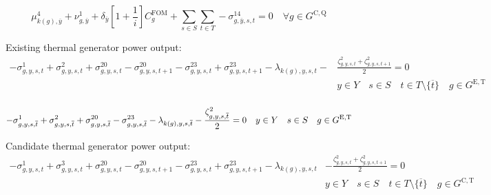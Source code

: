 \documentclass{article}
\newcommand{\sGeneratorsExistingThermal}{G^{\mathrm{E,T}}}
\newcommand{\sGeneratorsCandidateThermal}{G^{\mathrm{C,T}}}
\newcommand{\sStorageCandidate}{G^{\mathrm{C,Q}}}
\newcommand{\sYears}{Y}
\newcommand{\sScenarios}{S}
\newcommand{\sIntervals}{T}
\newcommand{\iGenerator}{g}
\newcommand{\iYear}{y}
\newcommand{\iYearTerminal}{\overline{\iYear}}
\newcommand{\iScenario}{s}
\newcommand{\iInterval}{t}
\newcommand{\iIntervalTerminal}{\overline{\iInterval}}
\newcommand{\iZone}{z}
\newcommand{\cFixedOperationsMaintenanceCostGenerator}[1][\iGenerator]{C^{\mathrm{FOM}}_{#1}}
\newcommand{\cInterestRate}{i}
\newcommand{\cDiscountRate}[1][\iYear]{\delta_{#1}}
\newcommand{\dStorageBuildLimit}[1][\iZone,\iYear]{\mu_{#1}^{4}}
\newcommand{\dTotalInstallCapacity}[1][\iGenerator,\iYear]{\nu_{#1}^{1}}
\newcommand{\dMinPowerOutput}[1][\iGenerator,\iYear,\iScenario,\iInterval]{\sigma_{#1}^{1}}
\newcommand{\dMaxPowerOutputExistingThermal}[1][\iGenerator,\iYear,\iScenario,\iInterval]{\sigma_{#1}^{2}}
\newcommand{\dMaxPowerOutputCandidateThermal}[1][\iGenerator,\iYear,\iScenario,\iInterval]{\sigma_{#1}^{3}}
\newcommand{\dMaxDischargingRateCandidate}[1][\iGenerator,\iYear,\iScenario,\iInterval]{\sigma_{#1}^{14}}
\newcommand{\dRampRateUp}[1][\iGenerator,\iYear,\iScenario,\iInterval]{\sigma_{#1}^{20}}
\newcommand{\dRampRateDown}[1][\iGenerator,\iYear,\iScenario,\iInterval]{\sigma_{#1}^{23}}
\newcommand{\dPowerBalance}[1][\iZone,\iYear,\iScenario,\iInterval]{\lambda_{#1}}
\newcommand{\dGeneratorEnergyOutput}[1][\iGenerator,\iYear,\iScenario,\iInterval]{\zeta_{#1}^{2}}
\begin{document}
\begin{equation}
\dStorageBuildLimit[k(\iGenerator),\iYearTerminal] + \dTotalInstallCapacity[\iGenerator,\iYearTerminal] + \cDiscountRate[\iYearTerminal] \left[1 + \frac{1}{\cInterestRate}\right] \cFixedOperationsMaintenanceCostGenerator + \sum\limits_{\iScenario \in \sScenarios}\sum\limits_{\iInterval \in \sIntervals} - \dMaxDischargingRateCandidate[\iGenerator,\iYearTerminal,\iScenario,\iInterval] = 0 \quad \forall \iGenerator \in \sStorageCandidate
\end{equation}

Existing thermal generator power output:
\begin{align}
-\dMinPowerOutput + \dMaxPowerOutputExistingThermal + \dRampRateUp - \dRampRateUp[\iGenerator,\iYear,\iScenario,\iInterval+1] - \dRampRateDown + \dRampRateDown[\iGenerator,\iYear,\iScenario,\iInterval+1] - \dPowerBalance[k(\iGenerator),\iYear,\iScenario,\iInterval] - & \frac{\dGeneratorEnergyOutput + \dGeneratorEnergyOutput[\iGenerator,\iYear,\iScenario,\iInterval+1]}{2} = 0\\\nonumber
& \iYear \in \sYears \quad \iScenario \in \sScenarios \quad \iInterval \in \sIntervals \setminus \{\iIntervalTerminal\} \quad \iGenerator \in \sGeneratorsExistingThermal\\\nonumber
\end{align}

\begin{equation}
-\dMinPowerOutput[\iGenerator,\iYear,\iScenario,\iIntervalTerminal] + \dMaxPowerOutputExistingThermal[\iGenerator,\iYear,\iScenario,\iIntervalTerminal] + \dRampRateUp[\iGenerator,\iYear,\iScenario,\iIntervalTerminal] - \dRampRateDown[\iGenerator,\iYear,\iScenario,\iIntervalTerminal] - \dPowerBalance[k(\iGenerator),\iYear,\iScenario,\iIntervalTerminal] - \frac{\dGeneratorEnergyOutput[\iGenerator,\iYear,\iScenario,\iIntervalTerminal]}{2} = 0 \quad \iYear \in \sYears \quad \iScenario \in \sScenarios \quad \iGenerator \in \sGeneratorsExistingThermal\\
\end{equation}

Candidate thermal generator power output:
\begin{align}
-\dMinPowerOutput + \dMaxPowerOutputCandidateThermal + \dRampRateUp - \dRampRateUp[\iGenerator,\iYear,\iScenario,\iInterval+1] - \dRampRateDown + \dRampRateDown[\iGenerator,\iYear,\iScenario,\iInterval+1] - \dPowerBalance[k(\iGenerator),\iYear,\iScenario,\iInterval] & - \frac{\dGeneratorEnergyOutput + \dGeneratorEnergyOutput[\iGenerator,\iYear,\iScenario,\iInterval+1]}{2} = 0\\\nonumber
& \iYear \in \sYears \quad \iScenario \in \sScenarios \quad \iInterval \in \sIntervals \setminus \{\iIntervalTerminal\} \quad \iGenerator \in \sGeneratorsCandidateThermal\\\nonumber
\end{align}
\end{document}
